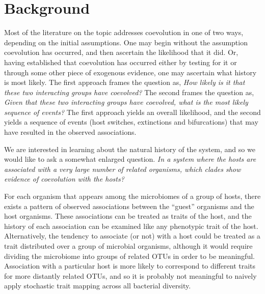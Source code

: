 \section{Background}

Most of the literature on the topic addresses coevolution in one of two ways, depending on the initial assumptions. One may begin without the assumption coevolution has occurred, and then ascertain the likelihood that it did. Or, having established that coevolution has occurred either by testing for it or through some other piece of exogenous evidence, one may ascertain what history is most likely. The first approach frames the question as, {\em How likely is it that these two interacting groups have coevolved?} The second frames the question as, {\em Given that these two interacting groups have coevolved, what is the most likely sequence of events?} The first approach yields an overall likelihood, and the second yields a sequence of events (host switches, extinctions and bifurcations) that may have resulted in the observed associations.

We are interested in learning about the natural history of the system, and so we would like to ask a somewhat enlarged question. {\em In a system where the hosts are associated with a very large number of related organisms, which clades show evidence of coevolution with the hosts?}

For each organism that appears among the microbiomes of a group of hosts, there exists a pattern of observed associations between the ``guest'' organisms and the host organisms. These associations can be treated as traits of the host, and the history of each association can be examined like any phenotypic trait of the host. Alternatively, the tendency to associate (or not) with a host could be treated as a trait distributed over a group of microbial organisms, although it would require dividing the microbiome into groups of related OTUs in order to be meaningful. Association with a particular host is more likely to correspond to different traits for more distantly related OTUs, and so it is probably not meaningful to naively apply stochastic trait mapping across all bacterial diversity.



